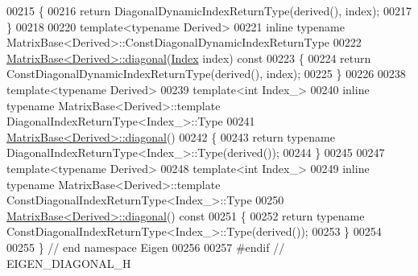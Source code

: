\begin{DoxyCode}
00215 \{
00216   \textcolor{keywordflow}{return} DiagonalDynamicIndexReturnType(derived(), index);
00217 \}
00218 
00220 \textcolor{keyword}{template}<\textcolor{keyword}{typename} Derived>
00221 \textcolor{keyword}{inline} \textcolor{keyword}{typename} MatrixBase<Derived>::ConstDiagonalDynamicIndexReturnType
00222 \hyperlink{group___core___module_ab5768147536273eb2dbdfa389cfd26a3}{MatrixBase<Derived>::diagonal}(\hyperlink{namespace_eigen_a62e77e0933482dafde8fe197d9a2cfde}{Index} index)\textcolor{keyword}{ const}
00223 \textcolor{keyword}{}\{
00224   \textcolor{keywordflow}{return} ConstDiagonalDynamicIndexReturnType(derived(), index);
00225 \}
00226 
00238 \textcolor{keyword}{template}<\textcolor{keyword}{typename} Derived>
00239 \textcolor{keyword}{template}<\textcolor{keywordtype}{int} Index\_>
00240 \textcolor{keyword}{inline} \textcolor{keyword}{typename} MatrixBase<Derived>::template DiagonalIndexReturnType<Index\_>::Type
00241 \hyperlink{group___core___module_ab5768147536273eb2dbdfa389cfd26a3}{MatrixBase<Derived>::diagonal}()
00242 \{
00243   \textcolor{keywordflow}{return} \textcolor{keyword}{typename} DiagonalIndexReturnType<Index\_>::Type(derived());
00244 \}
00245 
00247 \textcolor{keyword}{template}<\textcolor{keyword}{typename} Derived>
00248 \textcolor{keyword}{template}<\textcolor{keywordtype}{int} Index\_>
00249 \textcolor{keyword}{inline} \textcolor{keyword}{typename} MatrixBase<Derived>::template ConstDiagonalIndexReturnType<Index\_>::Type
00250 \hyperlink{group___core___module_ab5768147536273eb2dbdfa389cfd26a3}{MatrixBase<Derived>::diagonal}()\textcolor{keyword}{ const}
00251 \textcolor{keyword}{}\{
00252   \textcolor{keywordflow}{return} \textcolor{keyword}{typename} ConstDiagonalIndexReturnType<Index\_>::Type(derived());
00253 \}
00254 
00255 \} \textcolor{comment}{// end namespace Eigen}
00256 
00257 \textcolor{preprocessor}{#endif // EIGEN\_DIAGONAL\_H}
\end{DoxyCode}

